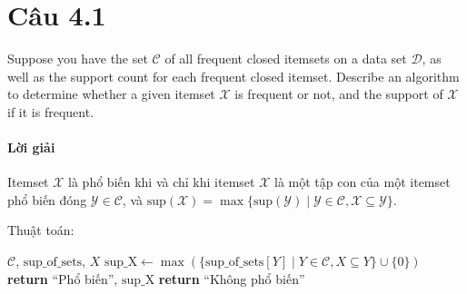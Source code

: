 \section{Câu 4.1}
Suppose you have the set $\mathcal{C}$ of all frequent closed itemsets on a data set $\mathcal{D}$, as well as the support count for each frequent closed itemset. Describe an algorithm to determine whether a given itemset $\mathcal{X}$ is frequent or not, and the support of $\mathcal{X}$ if it is frequent.

\paragraph{Lời giải}
Itemset $\mathcal{X}$ là phổ biến khi và chỉ khi itemset $\mathcal{X}$ là một tập con của một itemset phổ biến đóng $\mathcal{Y} \in \mathcal{C}$, và $\text{sup}(\mathcal{X}) = \max\{\text{sup}(\mathcal{Y})\mid\mathcal{Y} \in \mathcal{C}, \mathcal{X} \subseteq \mathcal{Y}\}$.

Thuật toán:
\begin{algorithm}[H]
    \caption{Kiểm tra tính phổ biến của tập $\mathcal{X}$}
    \begin{algorithmic}[1]
        \Require $\mathcal{C}$, $\text{sup\_of\_sets}$, $X$
        \State $\text{sup\_X} \gets \max(\{ \text{sup\_of\_sets}[Y] \mid Y \in \mathcal{C}, X \subseteq Y \} \cup \{0\})$
        \State \textbf{return} ``Phổ biến'', $\text{sup\_X}$
        \Else
        \State \textbf{return} ``Không phổ biến''
        \EndIf
    \end{algorithmic}
    \label{alg:1}
\end{algorithm}
